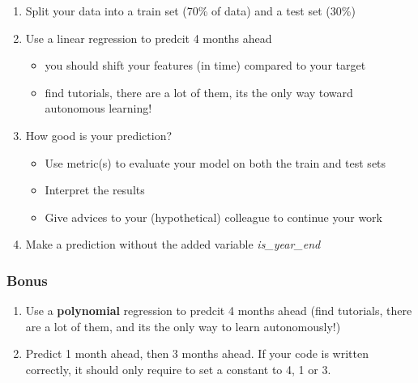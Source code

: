 \begin{enumerate}
    \item Split your data into a train set (70\% of data) and a test set (30\%)
    \item Use a linear regression to predcit 4 months ahead
    \begin{itemize}
        \item you should shift your features (in time) compared to your target
        \item find tutorials, there are a lot of them, its the only way toward autonomous learning!
    \end{itemize}
    \item How good is your prediction?
    \begin{itemize}
        \item Use metric(s) to evaluate your model on both the train and test sets
        \item Interpret the results
        \item Give advices to your (hypothetical) colleague to continue your work
    \end{itemize}
    \item Make a prediction without the added variable \textit{is\_year\_end}

\end{enumerate}



\subsubsection{Bonus}

\begin{enumerate}
    \item Use a \textbf{polynomial} regression to predcit 4 months ahead (find tutorials, there are a lot of them, and its the only way to learn autonomously!)
    \item Predict 1 month ahead, then 3 months ahead. If your code is written correctly, it should only require to set a constant to 4, 1 or 3.
\end{enumerate}


